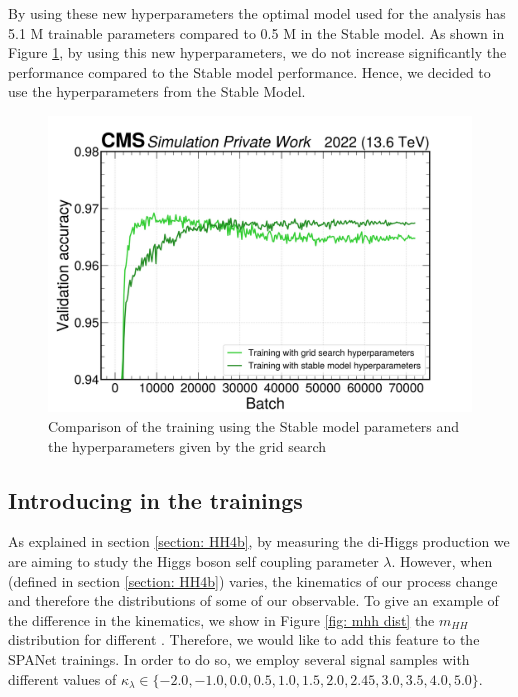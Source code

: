 \newpage
By using these new hyperparameters the optimal model used for the analysis has 5.1 M trainable parameters compared to 0.5 M in the Stable model. 
As shown in Figure \ref{fig: comp grid search}, by using this new hyperparameters, 
we do not increase significantly the performance compared to the Stable model performance. 
Hence, we decided to use the hyperparameters from the Stable Model.

\begin{figure}[hbt]
    \centering
    \includegraphics[width=0.6\linewidth]{Images/6.Improving/Grid search/grid search.png}
    \caption{Comparison of the training using the Stable model parameters and the hyperparameters given by the grid search}
    \label{fig: comp grid search}
\end{figure}


\clearpage

\subsection{Introducing \kl in the trainings} \label{subsection: kl}

As explained in section \ref{section: HH4b}, by measuring the di-Higgs production we are aiming to study 
the Higgs boson self coupling parameter $\lambda$. However, when \kl (defined in section \ref{section: HH4b}) varies, the kinematics 
of our process change and therefore the distributions of some of our observable. To give an example of the difference in the kinematics, we show in Figure \ref{fig: mhh dist} the $m_{HH}$ distribution for different \kl. Therefore, we would like to add this feature to the SPANet trainings. 
In order to do so, we employ several signal samples with different values of $\kappa_\lambda 
\in \{-2.0, -1.0, 0.0, 0.5, 1.0, 1.5, 2.0, 2.45, 3.0, 3.5, 4.0, 5.0\}$. 


